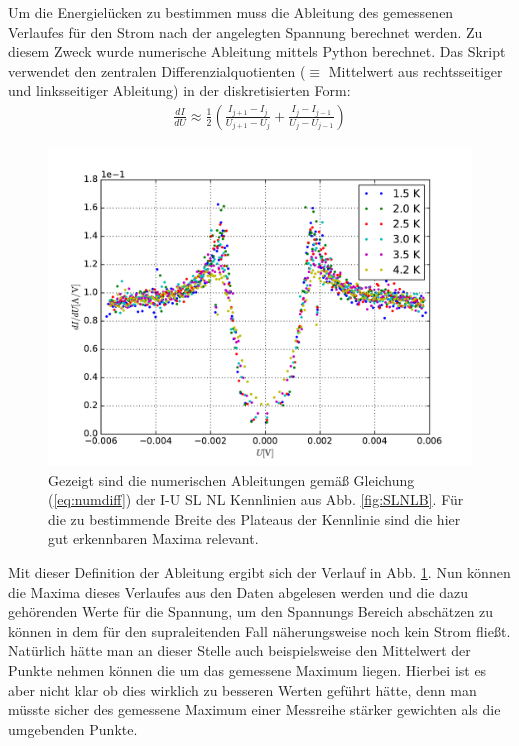 \documentclass[twoside,        %
               BCOR12mm,       %
               english,ngerman, %
               fleqn,headsepline=false,footsepline=false
              ]{MFPREPORT}
\begin{document}
Um die Energielücken zu bestimmen muss die Ableitung des gemessenen Verlaufes für den Strom nach der angelegten Spannung berechnet werden.
Zu diesem Zweck wurde numerische Ableitung mittels Python berechnet.
Das Skript verwendet den zentralen Differenzialquotienten
($\equiv$ Mittelwert aus rechtsseitiger und linksseitiger Ableitung) in der diskretisierten Form:
\begin{align}
\frac{d I}{d U} \approx \frac{1}{2} 
\left(
\frac{I_{j+1}-I_{j}}{U_{j+1}-U_{j}} 
+
\frac{I_{j}-I_{j-1}}{U_{j}-U_{j-1}}
\right)
\label{eq:numdiff}
\end{align}
\begin{figure}
\centering
\includegraphics[scale=0.7]{3.pdf}
\caption{Gezeigt sind die numerischen Ableitungen gemäß Gleichung (\ref{eq:numdiff}) der I-U SL NL Kennlinien aus Abb. \ref{fig:SLNLB}. 
		Für die zu bestimmende Breite des Plateaus der Kennlinie sind die hier gut erkennbaren Maxima relevant.}
\label{fig:SLNLDIF}
\end{figure}
Mit dieser Definition der Ableitung ergibt sich der Verlauf in Abb. \ref{fig:SLNLDIF}.
Nun können die Maxima dieses Verlaufes aus den Daten abgelesen werden
und die dazu gehörenden Werte für die Spannung, um den Spannungs
Bereich abschätzen zu können in dem für den supraleitenden Fall näherungsweise noch kein Strom fließt.
Natürlich hätte man an dieser Stelle auch beispielsweise den Mittelwert der Punkte nehmen können die um das gemessene Maximum liegen.
Hierbei ist es aber nicht klar ob dies wirklich zu besseren Werten geführt hätte, denn man müsste sicher des gemessene Maximum einer Messreihe stärker gewichten als die umgebenden Punkte. 
\end{document}
